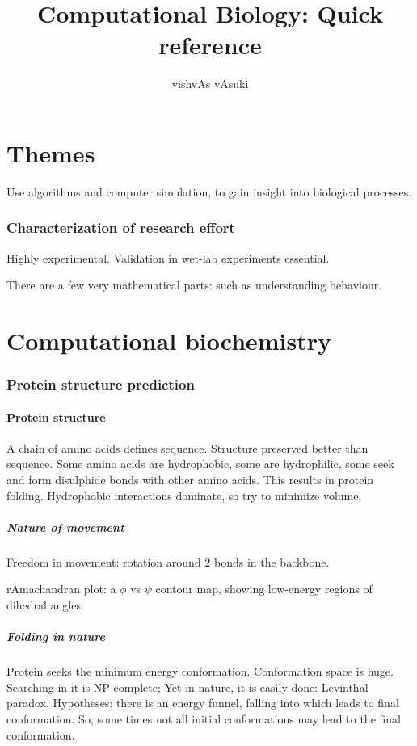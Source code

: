\documentclass[oneside, article]{memoir}
\title{Computational Biology: Quick reference}
\author{vishvAs vAsuki}
\begin{document}
\maketitle
\tableofcontents

\part{Themes}
Use algorithms and computer simulation, to gain insight into biological processes.

\section{Characterization of research effort}
Highly experimental. Validation in wet-lab experiments essential.

There are a few very mathematical parts: such as understanding behaviour.

\part{Computational biochemistry}
\section{Protein structure prediction}
\subsection{Protein structure}
A chain of amino acids defines sequence. Structure preserved better than sequence. Some amino acids are hydrophobic, some are hydrophilic, some seek and form disulphide bonds with other amino acids. This results in protein folding. Hydrophobic interactions dominate, so try to minimize volume.

\subsubsection{Nature of movement}
Freedom in movement: rotation around 2 bonds in the backbone.

rAmachandran plot: a $\phi$ vs $\psi$ contour map, showing low-energy regions of dihedral angles.

\subsubsection{Folding in nature}
Protein seeks the minimum energy conformation. Conformation space is huge. Searching in it is NP complete; Yet in nature, it is easily done: Levinthal paradox. Hypotheses: there is an energy funnel, falling into which leads to final conformation. So, some times not all initial conformations may lead to the final conformation.
\end{document}
